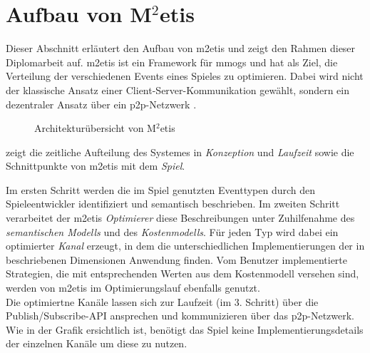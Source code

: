 \section{Aufbau von M$^2$etis}
\label{chap:grundlagen:aufbau_metis}

Dieser Abschnitt erläutert den Aufbau von \ac{m2etis}  und zeigt den Rahmen dieser Diplomarbeit auf. \ac{m2etis} ist ein Framework für \acp{mmog} und hat als Ziel, die Verteilung der verschiedenen Events eines Spieles zu optimieren. Dabei wird nicht der klassische Ansatz einer Client-Server-Kommunikation gewählt, sondern ein dezentraler Ansatz über ein \ac{p2p}-Netzwerk \cite{Fischer2010a, Fischer2010Event}.

\begin{figure}[htbp]
\centering
{}
\caption{Architekturübersicht von M$^2$etis}
\label{fig:metis_aufbau}
\end{figure}

 zeigt die zeitliche Aufteilung des Systemes in \emph{Konzeption} und \emph{Laufzeit} sowie die Schnittpunkte von \ac{m2etis} mit dem \emph{Spiel}.

Im ersten Schritt werden die im Spiel genutzten Eventtypen durch den Spieleentwickler identifiziert und semantisch beschrieben. Im zweiten Schritt verarbeitet der \ac{m2etis} \emph{Optimierer} diese Beschreibungen unter Zuhilfenahme des \emph{semantischen Modells} und des \emph{Kostenmodells}. Für jeden Typ wird dabei ein optimierter \emph{Kanal} erzeugt, in dem die unterschiedlichen Implementierungen der in \cite{Fischer2010a} beschriebenen Dimensionen Anwendung finden. Vom Benutzer implementierte Strategien, die mit entsprechenden Werten aus dem Kostenmodell versehen sind, werden von \ac{m2etis} im Optimierungslauf ebenfalls genutzt.\\
Die optimiertne Kanäle lassen sich zur Laufzeit (im 3. Schritt) über die Publish/Subscribe-API ansprechen und kommunizieren über das \ac{p2p}-Netzwerk. Wie in der Grafik ersichtlich ist, benötigt das Spiel keine Implementierungsdetails der einzelnen Kanäle um diese zu nutzen.

